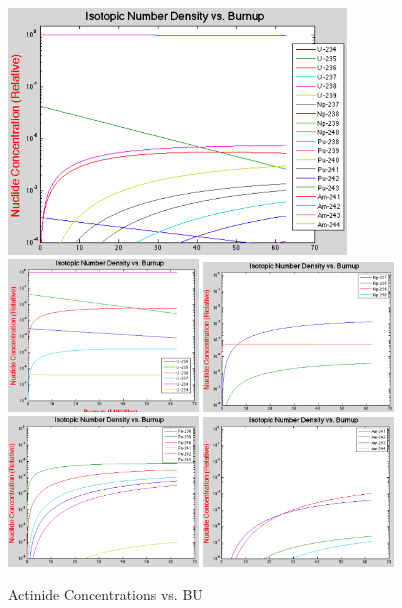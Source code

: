 \documentclass{school-22.211-notes}
\begin{document}
\clearpage
{}
\begin{figure}
  \centering
  \includegraphics[width=0.8\textwidth]{images/dfs/actinide-vs-BU.png}
  \includegraphics[width=0.45\textwidth]{images/dfs/actinide-vs-BU-1.png}
  \includegraphics[width=0.45\textwidth]{images/dfs/actinide-vs-BU-2.png}
  \includegraphics[width=0.45\textwidth]{images/dfs/actinide-vs-BU-3.png}
  \includegraphics[width=0.45\textwidth]{images/dfs/actinide-vs-BU-4.png}
  \caption{Actinide Concentrations vs. BU} \label{actinide-vs-BU}
\end{figure}
\end{document}
